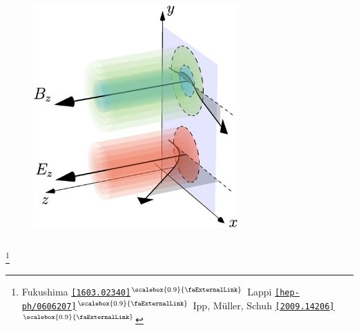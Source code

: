 \documentclass[aspectratio=169,11pt,usenames,dvipsnames]{beamer}
\renewcommand{\thefootnote}{}
\newcommand\blfootnote[1]{%
  \begingroup
  \renewcommand\thefootnote{}\footnote{#1}%
  \addtocounter{footnote}{-1}%
  \endgroup
}
\begin{document}
\begin{frame}
\begin{columns}[onlytextwidth,t]
        \begin{center}
            \begin{figure}
                \centering
                \includegraphics[width=0.7\textwidth]{images/1-s2.0-S0370269320306134-gr003_lrg.jpg}
            \end{figure}
        \end{center}

    \end{columns}
    \blfootnote{\scriptsize Fukushima \href{https://arxiv.org/abs/1603.02340}{{\color{palteal}\texttt{[1603.02340]}$^\text{\scalebox{0.9}{\faExternalLink}}$}} Lappi \href{https://arxiv.org/abs/hep-ph/0606207}{{\color{palviolet}\texttt{[hep-ph/0606207]}$^\text{\scalebox{0.9}{\faExternalLink}}$}} Ipp, Müller, Schuh \href{https://arxiv.org/abs/2009.14206}{{\color{palgold}\texttt{[2009.14206]}$^\text{\scalebox{0.9}{\faExternalLink}}$}}
    }
\end{frame}
\end{document}
